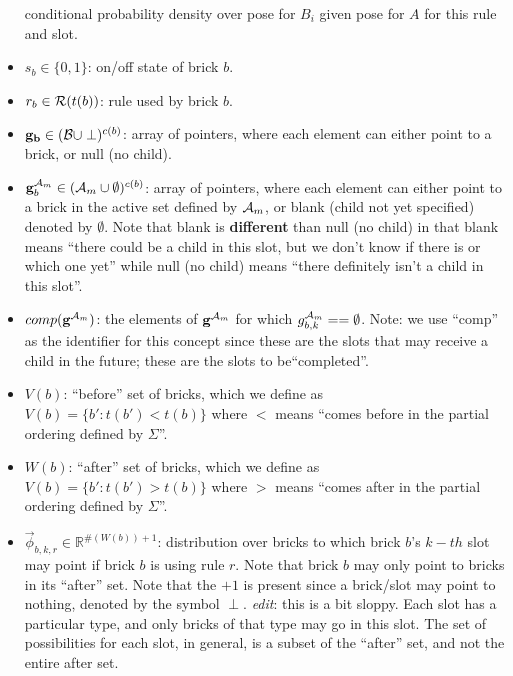 \documentclass[11pt]{article}
\newcommand{\A}{{\cal A}}
\newcommand{\symb}{\Sigma}
\newcommand{\B}{\cal B}
\newcommand{\Am}{\A_{m}}
\newcommand{\gcomp}{comp(\mathbf{g}^{\Am})}
\begin{document}
\begin{itemize}
conditional probability density over pose for $B_i$ given pose for $A$ for this rule and slot.

\item $s_b \in \{0,1\}$: on/off state of brick $b$.

\item $r_b \in {\cal R}(t(b))$: rule used by brick $b$.

\item $\mathbf{g_b} \in ( {\B} \cup \perp )^{c(b)}$: array of pointers, where each element can either point to a brick, or null (no child).

\item $\mathbf{g}_b^{\Am} \in ( {\Am} \cup \emptyset )^{c(b)}$: array of pointers, where each element can either point to a brick in the active set defined by $\Am$, or blank (child not yet specified) denoted by $\emptyset$. Note that blank is \textbf{different} than null (no child) in that blank means ``there could be a child in this slot, but we don't know if there is or which one yet'' while null (no child) means ``there definitely isn't a child in this slot''.

\item $\gcomp$: the elements of $\mathbf{g}^{\Am}$ for which $g_{b,k}^{\Am} == \emptyset$. Note: we use ``comp'' as the identifier for this concept since these are the slots that may receive a child in the future; these are the slots to be``completed''.

\item $V(b)$: ``before'' set of bricks, which we define as $V(b) = \{b' : t(b') < t(b) \}$ where $<$ means ``comes before in the partial ordering defined by $\symb$''.

\item $W(b)$: ``after'' set of bricks, which we define as $V(b) = \{b' : t(b') > t(b) \}$ where $>$ means ``comes after in the partial ordering defined by $\symb$''.

\item $\vec{\phi}_{b,k,r} \in \mathbb{R}^{\#(W(b))+1}$: distribution over bricks to which brick $b$'s $k-th$ slot may point if brick $b$ is using rule $r$. Note that brick $b$ may only point to bricks in its ``after'' set. Note that the $+1$ is present since a brick/slot may point to nothing, denoted by the symbol $\perp$. \emph{edit}: this is a bit sloppy. Each slot has a particular type, and only bricks of that type may go in this slot. The set of possibilities for each slot, in general, is a subset of the ``after'' set, and not the entire after set.


\end{itemize}
\end{document}
